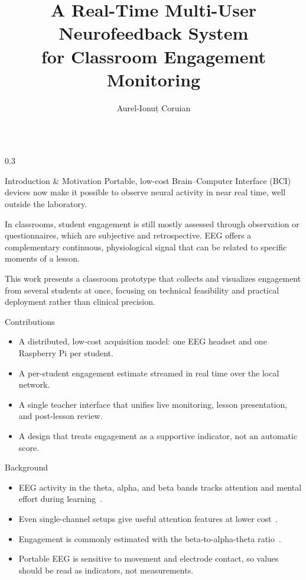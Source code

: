 \documentclass[final]{beamer}
\title{A Real-Time Multi-User Neurofeedback System \\ for Classroom Engagement Monitoring}
\author{Aurel-Ionuț Coruian}
\institute[shortinst]{Faculty of Computer Science, West University of Timișoara \quad Supervisor: Lect.\ Dr.\ Alin Brîndușescu}
\begin{document}
\begin{frame}[fragile]

\begin{columns}[t]

\separatorcolumn

\begin{column}{0.3\paperwidth}

\begin{block}{Introduction \& Motivation}
    Portable, low-cost Brain--Computer Interface (BCI) devices now make
    it possible to observe neural activity in near real time, well outside the
    laboratory.

    \bigskip
    In classrooms, student engagement is still mostly assessed through
    observation or questionnaires, which are subjective
    and retrospective. EEG offers a complementary
    continuous, physiological signal that can be related to specific
    moments of a lesson.

    \bigskip
    This work presents a classroom prototype that collects and visualizes
    engagement from several students at once, focusing on technical
    feasibility and practical deployment rather than clinical precision.
\end{block}

\begin{alertblock}{Contributions}
    \begin{itemize}
        \item A distributed, low-cost acquisition model: one EEG headset
            and one Raspberry Pi per student.
        \item A per-student engagement estimate streamed in real time
            over the local network.
        \item A single teacher interface that unifies live monitoring,
            lesson presentation, and post-lesson review.
        \item A design that treats engagement as a supportive indicator,
            not an automatic score.
    \end{itemize}
\end{alertblock}

\begin{block}{Background}
    \begin{itemize}
        \item EEG activity in the theta, alpha, and beta bands tracks
            attention and mental effort during learning~\cite{Apicella2022,Poulsen2017}.
        \item Even single-channel setups give useful attention features
            at lower cost~\cite{Liang2022}.
        \item Engagement is commonly estimated with the
            beta-to-alpha-theta ratio~\cite{Pope1995}.
        \item Portable EEG is sensitive to movement and electrode contact, so
            values should be read as indicators, not measurements.
    \end{itemize}
\end{block}


\end{column}
\end{columns}
\end{frame}
\end{document}
